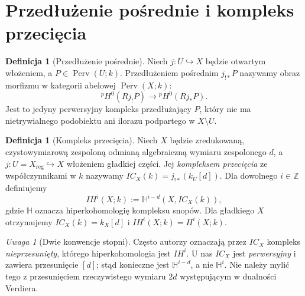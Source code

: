 \documentclass[11pt,a4paper,oneside]{report}
\newcommand{\Z}{\mathbb{Z}}
\theoremstyle{plain}
\theoremstyle{definition}
\newtheorem{definicja}[twierdzenie]{Definicja}
\theoremstyle{remark}
\newtheorem{uwaga}[twierdzenie]{Uwaga}
\begin{document}
\section{Przedłużenie pośrednie i kompleks przecięcia}
\begin{definicja}[Przedłużenie pośrednie]
\label{def:middle-extension-xiii}
Niech $j:U\hookrightarrow X$ będzie otwartym włożeniem,
a $P\in\operatorname{Perv}(U;k)$.
Przedłużeniem pośrednim $j_{!*}P$ nazywamy obraz
morfizmu w kategorii abelowej $\operatorname{Perv}(X;k)$:
\[
{}^p\!H^0(Rj_!P)\longrightarrow {}^p\!H^0(Rj_*P).
\]
Jest to jedyny perwersyjny kompleks przedłużający $P$,
który nie ma nietrywialnego podobiektu ani ilorazu
podpartego w $X\setminus U$.
\end{definicja}
\begin{definicja}[Kompleks przecięcia]
\label{def:ic-xiii}
Niech $X$ będzie zredukowaną, czystowymiarową zespoloną
odmianą algebraiczną wymiaru zespolonego $d$, a
$j:U=X_{\mathrm{reg}}\hookrightarrow X$ włożeniem
gładkiej części. Jej \emph{kompleksem przecięcia}
ze współczynnikami w $k$ nazywamy
$IC_X(k)=j_{!*}(k_U[d])$.
Dla dowolnego $i\in\Z$ definiujemy
\[
IH^i(X;k):=\mathbb H^{i-d}(X,IC_X(k)),
\]
gdzie $\mathbb H$ oznacza hiperkohomologię kompleksu snopów.
Dla gładkiego $X$ otrzymujemy $IC_X(k)=k_X[d]$
i $IH^i(X;k)=H^i(X;k)$.
\end{definicja}
\begin{uwaga}[Dwie konwencje stopni]
Często autorzy oznaczają przez $IC_X$ kompleks
\emph{nieprzesunięty}, którego hiperkohomologia
jest $IH^i$. U nas $IC_X$ jest \emph{perwersyjny}
i zawiera przesunięcie $[d]$; stąd konieczne jest
$\mathbb H^{i-d}$, a nie $\mathbb H^i$.
Nie należy mylić tego z przesunięciem rzeczywistego
wymiaru $2d$ występującym w dualności Verdiera.
\end{uwaga}
\end{document}

